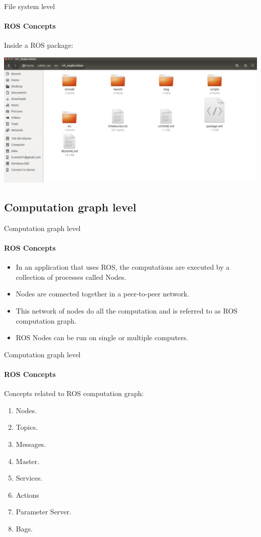 \documentclass{beamer}
\begin{document}
\begin{frame}{File system level}
    \framesubtitle{ROS Concepts}
Inside a ROS package:

\vspace{0.5cm}
\centering
\includegraphics[width=.9\linewidth]{figures/example_package.png}
\end{frame}

    
\subsection{Computation graph level}

\begin{frame}{Computation graph level}
    \framesubtitle{ROS Concepts}
    \begin{itemize}
        \item In an application that uses ROS, the computations are executed by a collection of processes called Nodes.
        \item Nodes are connected together in a peer-to-peer network.
        \item This network of nodes do all the computation and is referred to as ROS computation graph.
        \item ROS Nodes can be run on single or multiple computers.
    \end{itemize}
\end{frame}

\begin{frame}{Computation graph level}
    \framesubtitle{ROS Concepts}
    
    Concepts related to ROS computation graph:
    
    \begin{enumerate}
        \item Nodes.
        \item Topics.
        \item Messages.
        \item Master.
        \item Services.
        \item Actions
        \item Parameter Server.
        \item Bags.
    \end{enumerate}
\end{frame}
\end{document}
